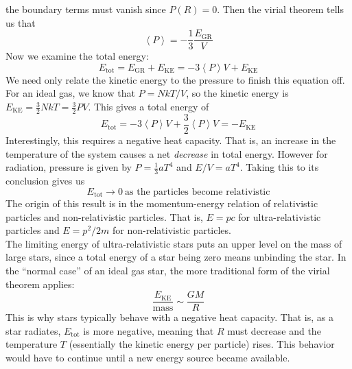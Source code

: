 \documentclass[10pt]{article}
\numberwithin{equation}{section}
\newcommand{\n}{\noindent}
\newcommand{\avg}[1]{\left\langle#1\right\rangle}
\begin{document}
        the boundary terms must vanish since $P(R)=0$. Then the virial
        theorem tells us that
	\begin{equation}
		\label{rss.8}\boxed{\avg{P}=-\frac{1}{3}\frac{E_{\mathrm{GR}}}{V}}
	\end{equation}
	Now we examine the total energy:
	\begin{equation}
		\label{rss.9} E_{\mathrm{tot}}=E_{\mathrm{GR}}+E_{\mathrm{KE}}=-3\avg{P}V+E_{\mathrm{KE}}
	\end{equation}
	We need only relate the kinetic energy to the pressure to finish this equation off. For an ideal gas, we know that $P=NkT/V$, so the kinetic energy is $E_{\mathrm{KE}}=\frac{3}{2}NkT=\frac{3}{2}PV$. This gives a total energy of
	\begin{equation}
		\label{rss.10} E_{\mathrm{tot}}=-3\avg{P}V+\frac{3}{2}\avg{P}V=-E_{\mathrm{KE}}
	\end{equation}
	Interestingly, this requires a negative heat capacity. That is, an increase in the temperature of the system causes a net \emph{decrease} in total energy. However for radiation, pressure is given by $P=\frac{1}{3}aT^4$ and $E/V=aT^4$. Taking this to its conclusion gives us
	\begin{equation}
		\label{rss.11} E_{\mathrm{tot}}\to 0\ \textrm{as the particles become relativistic}
	\end{equation}
	The origin of this result is in the momentum-energy relation of relativistic particles and non-relativistic particles. That is, $E=pc$ for ultra-relativistic particles and $E=p^2/2m$ for non-relativistic particles.\\
	
	\n The limiting energy of ultra-relativistic stars puts an upper level on the mass of large stars, since a total energy of a star being zero means unbinding the star. In the ``normal case'' of an ideal gas star, the more traditional form of the virial theorem applies:
	\begin{equation}
		\label{rss.12} \frac{E_{\mathrm{KE}}}{\mathrm{mass}}\sim\frac{GM}{R}
	\end{equation}
	This is why stars typically behave with a negative heat capacity. That is, as a star radiates, $E_{\mathrm{tot}}$ is more negative, meaning that $R$ must decrease and the temperature $T$ (essentially the kinetic energy per particle) rises. This behavior would have to continue until a new energy source became available.
\end{document}
